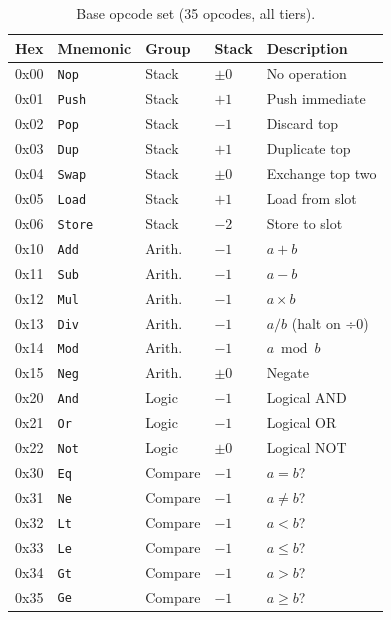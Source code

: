 \documentclass[sigplan,10pt,review]{acmart}
\begin{document}
\begin{table}[h]
\centering
\caption{Base opcode set (35 opcodes, all tiers).}
\label{tab:opcodes-full}
\renewcommand{\arraystretch}{1.1}
\begin{tabular}{cllll}
\toprule
\textbf{Hex} & \textbf{Mnemonic} & \textbf{Group} & \textbf{Stack} & \textbf{Description} \\
\midrule
0x00 & \texttt{Nop}       & Stack    & $\pm0$ & No operation \\
0x01 & \texttt{Push}      & Stack    & $+1$   & Push immediate \\
0x02 & \texttt{Pop}       & Stack    & $-1$   & Discard top \\
0x03 & \texttt{Dup}       & Stack    & $+1$   & Duplicate top \\
0x04 & \texttt{Swap}      & Stack    & $\pm0$ & Exchange top two \\
0x05 & \texttt{Load}      & Stack    & $+1$   & Load from slot \\
0x06 & \texttt{Store}     & Stack    & $-2$   & Store to slot \\
\midrule
0x10 & \texttt{Add}       & Arith.   & $-1$   & $a + b$ \\
0x11 & \texttt{Sub}       & Arith.   & $-1$   & $a - b$ \\
0x12 & \texttt{Mul}       & Arith.   & $-1$   & $a \times b$ \\
0x13 & \texttt{Div}       & Arith.   & $-1$   & $a / b$ (halt on ÷0) \\
0x14 & \texttt{Mod}       & Arith.   & $-1$   & $a \bmod b$ \\
0x15 & \texttt{Neg}       & Arith.   & $\pm0$ & Negate \\
\midrule
0x20 & \texttt{And}       & Logic    & $-1$   & Logical AND \\
0x21 & \texttt{Or}        & Logic    & $-1$   & Logical OR \\
0x22 & \texttt{Not}       & Logic    & $\pm0$ & Logical NOT \\
0x30 & \texttt{Eq}        & Compare  & $-1$   & $a = b$? \\
0x31 & \texttt{Ne}        & Compare  & $-1$   & $a \neq b$? \\
0x32 & \texttt{Lt}        & Compare  & $-1$   & $a < b$? \\
0x33 & \texttt{Le}        & Compare  & $-1$   & $a \leq b$? \\
0x34 & \texttt{Gt}        & Compare  & $-1$   & $a > b$? \\
0x35 & \texttt{Ge}        & Compare  & $-1$   & $a \geq b$? \\

\end{tabular}
\end{table}
\end{document}
